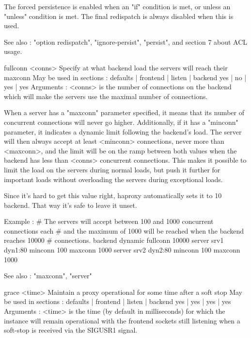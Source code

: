   The forced persistence is enabled when an "if" condition is met, or unless an
  "unless" condition is met. The final redispatch is always disabled when this
  is used.

  See also : "option redispatch", "ignore-persist", "persist",
             and section 7 about ACL usage.


fullconn <conns>
  Specify at what backend load the servers will reach their maxconn
  May be used in sections :   defaults | frontend | listen | backend
                                 yes   |    no    |   yes  |   yes
  Arguments :
    <conns>   is the number of connections on the backend which will make the
              servers use the maximal number of connections.

  When a server has a "maxconn" parameter specified, it means that its number
  of concurrent connections will never go higher. Additionally, if it has a
  "minconn" parameter, it indicates a dynamic limit following the backend's
  load. The server will then always accept at least <minconn> connections,
  never more than <maxconn>, and the limit will be on the ramp between both
  values when the backend has less than <conns> concurrent connections. This
  makes it possible to limit the load on the servers during normal loads, but
  push it further for important loads without overloading the servers during
  exceptional loads.

  Since it's hard to get this value right, haproxy automatically sets it to
  10%
  backend. That way it's safe to leave it unset.

  Example :
     # The servers will accept between 100 and 1000 concurrent connections each
     # and the maximum of 1000 will be reached when the backend reaches 10000
     # connections.
     backend dynamic
        fullconn   10000
        server     srv1   dyn1:80 minconn 100 maxconn 1000
        server     srv2   dyn2:80 minconn 100 maxconn 1000

  See also : "maxconn", "server"


grace <time>
  Maintain a proxy operational for some time after a soft stop
  May be used in sections :   defaults | frontend | listen | backend
                                 yes   |    yes   |   yes  |   yes
  Arguments :
    <time>    is the time (by default in milliseconds) for which the instance
              will remain operational with the frontend sockets still listening
              when a soft-stop is received via the SIGUSR1 signal.

